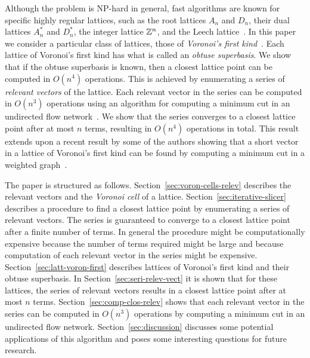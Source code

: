 \documentclass[final,leqno]{siamltex}
\begin{document}
Although the problem is NP-hard in general, fast algorithms are known for specific highly regular lattices, such as the root lattices $A_n$ and $D_n$, their dual lattices $A_n^*$ and $D_n^*$, the integer lattice ${\mathbb Z}^{n}$, and the Leech lattice~\cite[Chap. 4]{SPLAG}\cite{Conway1982FastQuantDec,Conway1986SoftDecLeechGolay, Clarkson1999:Anstar, McKilliam2008, McKilliam2008b, McKilliam2009CoxeterLattices,Vardy1993_leech_lattice_MLD}.  In this paper we consider a particular class of lattices, those of \emph{Voronoi's first kind}~\cite{ConwaySloane1992_voronoi_lattice_3d_obtuse_superbases,Valentin2003_coverings_tilings_low_dimension,Voronoi1908_main_paper}.  Each lattice of Voronoi's first kind has what is called an \emph{obtuse superbasis}.  We show that if the obtuse superbasis is known, then a closest lattice point can be computed in $O(n^4)$ operations.  This is achieved by enumerating a series of \emph{relevant vectors} of the lattice.  Each relevant vector in the series can be computed in $O(n^3)$ operations using an algorithm for computing a minimum cut in an undirected flow network~\cite{Picard_min_cuts_1974,Sankaran_solving_CDMA_mincut_1998,Ulukus_cdma_mincut_1998,Cormen2001}.  We show that the series converges to a closest lattice point after at most $n$ terms, resulting in $O(n^4)$ operations in total.  This result extends upon a recent result by some of the authors showing that a short vector in a lattice of Voronoi's first kind can be found by computing a minimum cut in a weighted graph~\cite{McKilliam_short_vectors_first_type_isit_2012}.

The paper is structured as follows.  Section~\ref{sec:voron-cells-relev} describes the relevant vectors and the \emph{Voronoi cell} of a lattice. Section~\ref{sec:iterative-slicer} describes a procedure to find a closest lattice point by enumerating a series of relevant vectors.  The series is guaranteed to converge to a closest lattice point after a finite number of terms.  In general the procedure might be computationally expensive because the number of terms required might be large and because computation of each relevant vector in the series might be expensive.  Section~\ref{sec:latt-voron-first} describes lattices of Voronoi's first kind and their obtuse superbasis.  In Section~\ref{sec:seri-relev-vect} it is shown that for these lattices, the series of relevant vectors results in a closest lattice point after at most $n$ terms.  Section~\ref{sec:comp-clos-relev} shows that each relevant vector in the series can be computed in $O(n^3)$ operations by computing a minimum cut in an undirected flow network.  Section~\ref{sec:discussion} discusses some potential applications of this algorithm and poses some interesting questions for future research.
\end{document}

